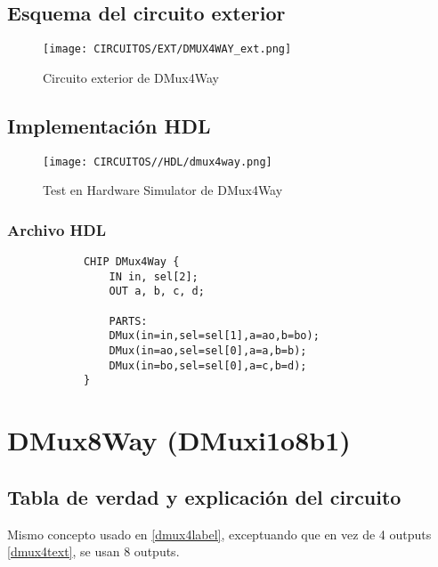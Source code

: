 \documentclass[12pt]{article}
\begin{document}
		\subsection{Esquema del circuito exterior}
		\begin{figure}[H]
			\centering
			\texttt{[image: CIRCUITOS/EXT/DMUX4WAY\_ext.png]}
			\caption{Circuito exterior de DMux4Way \cite{circuitverse}}
			\label{fig:dmux4way_ext}
		\end{figure}
		\subsection{Implementación HDL}
		\begin{figure}[H]
			\centering
			\texttt{[image: CIRCUITOS//HDL/dmux4way.png]}
			\caption{Test en Hardware Simulator de DMux4Way \cite{nand2tetris}}
			\label{fig:hdldmux4way}
		\end{figure}
		\subsubsection{Archivo HDL}
		\begin{lstlisting}
			CHIP DMux4Way {
				IN in, sel[2];
				OUT a, b, c, d;

				PARTS:
				DMux(in=in,sel=sel[1],a=ao,b=bo);
				DMux(in=ao,sel=sel[0],a=a,b=b);
				DMux(in=bo,sel=sel[0],a=c,b=d);
			}
		\end{lstlisting}
		\newpage


		\section{DMux8Way (DMuxi1o8b1)}
		\subsection{Tabla de verdad y explicación del circuito}
		Mismo concepto usado en \ref{dmux4label}, exceptuando que en vez de 4 outputs \ref{dmux4text}, se usan 8 outputs. \cite{nisan_nand2tetris_2005}
\end{document}
